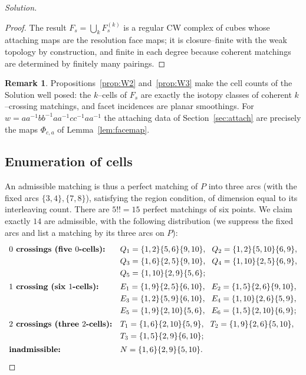 \documentclass{amsart}
\theoremstyle{definition}
\newtheorem{remark}{Remark}
\begin{document}
\begin{proof}[Solution]
\begin{proof}
The result $F_s=\bigcup_k F_s^{(k)}$ is a regular CW complex of cubes whose attaching maps are the
resolution face maps; it is closure–finite with the weak topology by construction, and finite in
each degree because coherent matchings are determined by finitely many pairings.
\end{proof}

\begin{remark}
Propositions~\ref{prop:W2} and~\ref{prop:W3} make the cell counts of the Solution well posed: the
$k$–cells of $F_s$ are exactly the isotopy classes of coherent $k$–crossing matchings, and facet
incidences are planar smoothings. For $w=aa^{-1}bb^{-1}aa^{-1}cc^{-1}aa^{-1}$ the attaching data
of Section~\ref{sec:attach} are precisely the maps $\Phi_{c,a}$ of Lemma~\ref{lem:facemap}.
\end{remark}


\subsection{Enumeration of cells}\label{sec:enum}

An admissible matching is thus a perfect matching of $P$ into three arcs (with the fixed arcs
$\{3,4\},\{7,8\}$), satisfying the region condition, of dimension equal to its interleaving
count. There are $5!!=15$ perfect matchings of six points. We claim exactly $14$ are
admissible, with the following distribution (we suppress the fixed arcs and list a matching by
its three arcs on $P$):
\begin{equation}\label{eq:list}
\renewcommand{\arraystretch}{1.25}
\begin{array}{l@{\quad}l}
\textbf{$0$ crossings (five $0$-cells):}
 & Q_1=\{1,2\}\{5,6\}\{9,10\},\ \ Q_2=\{1,2\}\{5,10\}\{6,9\},\\
 & Q_3=\{1,6\}\{2,5\}\{9,10\},\ \ Q_4=\{1,10\}\{2,5\}\{6,9\},\\
 & Q_5=\{1,10\}\{2,9\}\{5,6\};\\[2pt]
\textbf{$1$ crossing (six $1$-cells):}
 & E_1=\{1,9\}\{2,5\}\{6,10\},\ \ E_2=\{1,5\}\{2,6\}\{9,10\},\\
 & E_3=\{1,2\}\{5,9\}\{6,10\},\ \ E_4=\{1,10\}\{2,6\}\{5,9\},\\
 & E_5=\{1,9\}\{2,10\}\{5,6\},\ \ E_6=\{1,5\}\{2,10\}\{6,9\};\\[2pt]
\textbf{$2$ crossings (three $2$-cells):}
 & T_1=\{1,6\}\{2,10\}\{5,9\},\ \ T_2=\{1,9\}\{2,6\}\{5,10\},\\
 & T_3=\{1,5\}\{2,9\}\{6,10\};\\[2pt]
\textbf{inadmissible:} & N=\{1,6\}\{2,9\}\{5,10\}.
\end{array}
\end{equation}


\end{proof}
\end{document}
